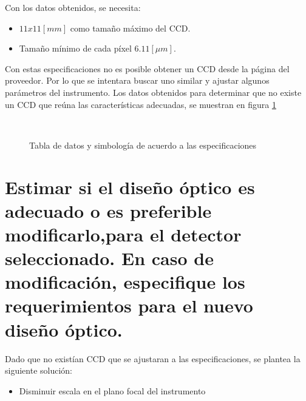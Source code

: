 \documentclass[a4paper,10pt]{article}
\begin{document}
Con los datos obtenidos, se necesita:
\begin{itemize}
\item $11x11[mm]$ como tamaño máximo del CCD.
\item Tamaño mínimo de cada píxel $6.11 [\mu m]$.
\end{itemize}

Con estas especificaciones no es posible obtener un CCD desde la página del
proveedor. Por lo que se intentara buscar uno similar y ajustar algunos
parámetros del instrumento.  Los datos obtenidos para determinar que no existe
un CCD que reúna las características adecuadas, se muestran en figura
\ref{fig:p1} 
\begin{figure}[ht!]
  \centering
  ~ 
  ~ 
  \caption{Tabla de datos y simbología de acuerdo a las especificaciones}
  \label{fig:p1}
\end{figure}



\section{Estimar si el diseño óptico es adecuado o es preferible
modificarlo,para el detector seleccionado. En caso de modificación, especifique
los requerimientos para el nuevo diseño óptico.} 

Dado que no existían CCD que se ajustaran a las especificaciones, se plantea la
siguiente solución:
\begin{itemize}
\item Disminuir escala en el plano focal del instrumento
\end{itemize}
\end{document}
